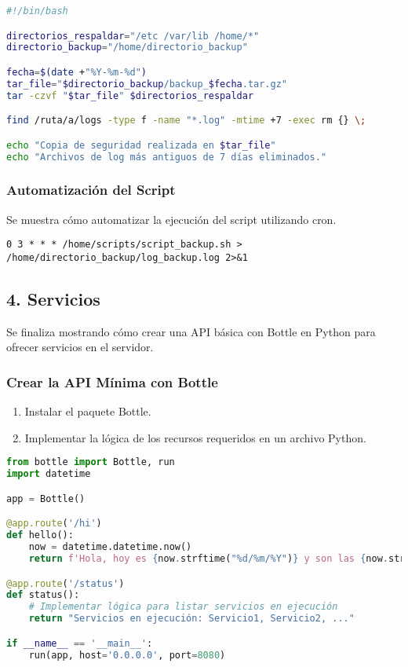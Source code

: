 \documentclass{article}
\begin{document}
\begin{lstlisting}[language=bash, caption=Script de Mantenimiento]
#!/bin/bash

directorios_respaldar="/etc /var/lib /home/*"
directorio_backup="/home/directorio_backup"

fecha=$(date +"%Y-%m-%d")
tar_file="$directorio_backup/backup_$fecha.tar.gz"
tar -czvf "$tar_file" $directorios_respaldar

find /ruta/a/logs -type f -name "*.log" -mtime +7 -exec rm {} \;

echo "Copia de seguridad realizada en $tar_file"
echo "Archivos de log más antiguos de 7 días eliminados."
\end{lstlisting}

\subsubsection{Automatización del Script}
Se muestra cómo automatizar la ejecución del script utilizando cron.

\begin{verbatim}
0 3 * * * /home/scripts/script_backup.sh > /home/directorio_backup/log_backup.log 2>&1
\end{verbatim}

\subsection{4. Servicios}
Se finaliza mostrando cómo crear una API básica con Bottle en Python para ofrecer servicios en el servidor.

\subsubsection{Crear la API Mínima con Bottle}
\begin{enumerate}
  \item Instalar el paquete Bottle.
  \item Implementar la lógica de los recursos requeridos en un archivo Python.
\end{enumerate}

\begin{lstlisting}[language=Python, caption=API Básica con Bottle]
from bottle import Bottle, run
import datetime

app = Bottle()

@app.route('/hi')
def hello():
    now = datetime.datetime.now()
    return f'Hola, hoy es {now.strftime("%d/%m/%Y")} y son las {now.strftime("%H:%M:%S")}'

@app.route('/status')
def status():
    # Implementar lógica para listar servicios en ejecución
    return "Servicios en ejecución: Servicio1, Servicio2, ..."

if __name__ == '__main__':
    run(app, host='0.0.0.0', port=8080)
\end{lstlisting}
\end{document}
